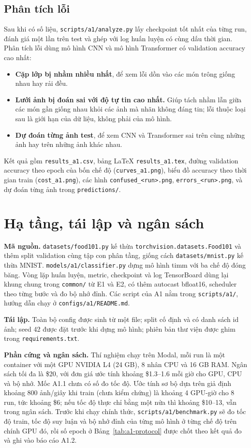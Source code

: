 \subsection{Phân tích lỗi}
Sau khi có số liệu, \texttt{scripts/a1/analyze.py} lấy checkpoint tốt nhất của từng run, đánh giá một lần trên test và ghép với log huấn luyện có cùng dấu thời gian. Phân tích lỗi dùng mô hình CNN và mô hình Transformer có validation accuracy cao nhất:
\begin{itemize}
\item \textbf{Cặp lớp bị nhầm nhiều nhất}, để xem lỗi dồn vào các món trông giống nhau hay rải đều.
\item \textbf{Lưới ảnh bị đoán sai với độ tự tin cao nhất.} Giúp tách nhầm lẫn giữa các món gần giống nhau khỏi các ảnh mà nhãn không đáng tin; lỗi thuộc loại sau là giới hạn của dữ liệu, không phải của mô hình.
\item \textbf{Dự đoán từng ảnh test}, để xem CNN và Transformer sai trên cùng những ảnh hay trên những ảnh khác nhau.
\end{itemize}
Kết quả gồm \texttt{results\_a1.csv}, bảng \LaTeX{} \texttt{results\_a1.tex}, đường validation accuracy theo epoch của bốn chế độ (\texttt{curves\_a1.png}), biểu đồ accuracy theo thời gian train (\texttt{cost\_a1.png}), các hình \texttt{confused\_<run>.png}, \texttt{errors\_<run>.png}, và dự đoán từng ảnh trong \texttt{predictions/}.

\section{Hạ tầng, tái lập và ngân sách}\label{sec:a1-infra}
\textbf{Mã nguồn.} \texttt{datasets/food101.py} kế thừa \texttt{torchvision.datasets.Food101} và thêm split validation cùng tập con phân tầng, giống cách \texttt{datasets/mnist.py} kế thừa MNIST. \texttt{models/a1/classifier.py} dựng mô hình timm với ba chế độ đóng băng. Vòng lặp huấn luyện, metric, checkpoint và log TensorBoard dùng lại khung chung trong \texttt{common/} từ E1 và E2, có thêm autocast bfloat16, scheduler theo từng bước và đo bộ nhớ đỉnh. Các script của A1 nằm trong \texttt{scripts/a1/}, hướng dẫn chạy ở \texttt{configs/a1/README.md}.

\textbf{Tái lập.} Toàn bộ config được sinh từ một file; split cố định và có danh sách id ảnh; seed 42 được đặt trước khi dựng mô hình; phiên bản thư viện được ghim trong \texttt{requirements.txt}.

\textbf{Phần cứng và ngân sách.} Thí nghiệm chạy trên Modal, mỗi run là một container với một GPU NVIDIA L4 (24 GB), 8 nhân CPU và 16 GB RAM. Ngân sách tối đa là \$20, với đơn giá ước tính khoảng \$1.3--1.6 mỗi giờ cho GPU, CPU và bộ nhớ. Mốc A1.1 chưa có số đo tốc độ. Ước tính sơ bộ dựa trên giả định khoảng 800 ảnh/giây khi train (chưa kiểm chứng) là khoảng 4 GPU-giờ cho 8 run, tức khoảng \$6; nếu tốc độ thực chỉ bằng một nửa thì khoảng \$10--13, vẫn trong ngân sách. Trước khi chạy chính thức, \texttt{scripts/a1/benchmark.py} sẽ đo tốc độ train, tốc độ suy luận và bộ nhớ đỉnh của từng mô hình ở từng chế độ trên chính GPU đó, rồi số epoch ở Bảng~\ref{tab:a1-protocol} được chốt theo kết quả đo và ghi vào báo cáo A1.2.

